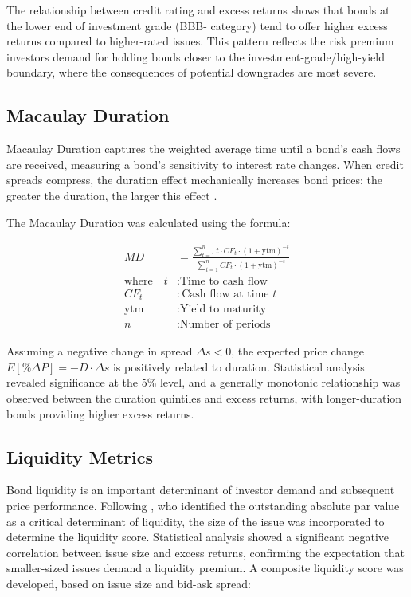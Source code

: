 The relationship between credit rating and excess returns shows that bonds at the lower end of investment grade (BBB- category) tend to offer higher excess returns compared to higher-rated issues. This pattern reflects the risk premium investors demand for holding bonds closer to the investment-grade/high-yield boundary, where the consequences of potential downgrades are most severe.

\subsection{Macaulay Duration}
Macaulay Duration captures the weighted average time until a bond's cash flows are received, measuring a bond's sensitivity to interest rate changes. When credit spreads compress, the duration effect mechanically increases bond prices: the greater the duration, the larger this effect \parencite[pp. 118 - 123]{Fabozzi2021TheEdition}.

The Macaulay Duration was calculated using the formula:

\begin{align}
MD &= \frac{\sum_{t=1}^{n} t \cdot CF_t \cdot (1 + \text{ytm})^{-t}}{\sum_{t=1}^{n} CF_t \cdot (1 + \text{ytm})^{-t}} \\
\text{where} \quad t &: \text{Time to cash flow} \nonumber\\
CF_t &: \text{Cash flow at time $t$} \nonumber\\
\text{ytm} &: \text{Yield to maturity} \nonumber\\
n &: \text{Number of periods} \nonumber
\end{align}

Assuming a negative change in spread $\Delta s < 0$, the expected price change $E[\%\Delta P] = -D \cdot \Delta s$ is positively related to duration. Statistical analysis revealed significance at the 5\% level, and a generally monotonic relationship was observed between the duration quintiles and excess returns, with longer-duration bonds providing higher excess returns.

\subsection{Liquidity Metrics}
Bond liquidity is an important determinant of investor demand and subsequent price performance. Following \textcite{Hotchkiss2002TheAnalysis}, who identified the outstanding absolute par value as a critical determinant of liquidity, the size of the issue was incorporated to determine the liquidity score. Statistical analysis showed a significant negative correlation between issue size and excess returns, confirming the expectation that smaller-sized issues demand a liquidity premium. A composite liquidity score was developed, based on issue size and bid-ask spread:

